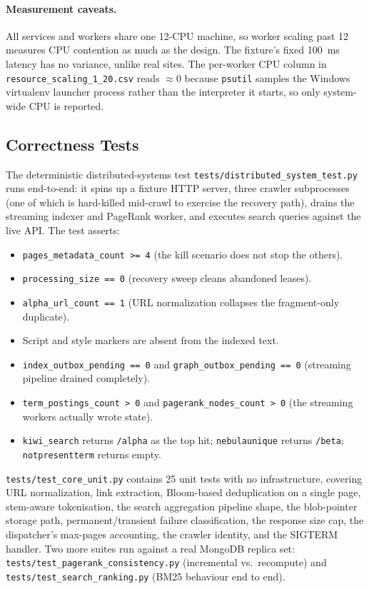 \documentclass[11pt,a4paper]{article}
\newcommand{\code}[1]{\texttt{#1}}
\begin{document}
\paragraph{Measurement caveats.} All services and workers share one 12-CPU machine, so worker scaling past 12 measures CPU contention as much as the design. The fixture's fixed 100~ms latency has no variance, unlike real sites. The per-worker CPU column in \code{resource\_scaling\_1\_20.csv} reads $\approx$0 because \code{psutil} samples the Windows virtualenv launcher process rather than the interpreter it starts, so only system-wide CPU is reported.

\subsection{Correctness Tests}

The deterministic distributed-systems test \code{tests/distributed\_system\_test.py} runs end-to-end: it spins up a fixture HTTP server, three crawler subprocesses (one of which is hard-killed mid-crawl to exercise the recovery path), drains the streaming indexer and PageRank worker, and executes search queries against the live API. The test asserts:

\begin{itemize}[leftmargin=1.4em]
  \item \code{pages\_metadata\_count >= 4} (the kill scenario does not stop the others).
  \item \code{processing\_size == 0} (recovery sweep cleans abandoned leases).
  \item \code{alpha\_url\_count == 1} (URL normalization collapses the fragment-only duplicate).
  \item Script and style markers are absent from the indexed text.
  \item \code{index\_outbox\_pending == 0} and \code{graph\_outbox\_pending == 0} (streaming pipeline drained completely).
  \item \code{term\_postings\_count > 0} and \code{pagerank\_nodes\_count > 0} (the streaming workers actually wrote state).
  \item \code{kiwi\_search} returns \code{/alpha} as the top hit; \code{nebulaunique} returns \code{/beta}; \code{notpresentterm} returns empty.
\end{itemize}

\code{tests/test\_core\_unit.py} contains 25 unit tests with no infrastructure, covering URL normalization, link extraction, Bloom-based deduplication on a single page, stem-aware tokenisation, the search aggregation pipeline shape, the blob-pointer storage path, permanent/transient failure classification, the response size cap, the dispatcher's max-pages accounting, the crawler identity, and the SIGTERM handler. Two more suites run against a real MongoDB replica set: \code{tests/test\_pagerank\_consistency.py} (incremental vs.\ recompute) and \code{tests/test\_search\_ranking.py} (BM25 behaviour end to end).
\end{document}
